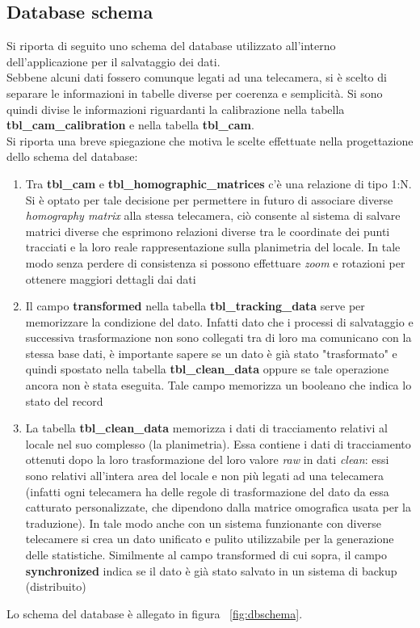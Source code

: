 \documentclass[a4paper,13pt,twoside]{article}
\begin{document}
\subsection{Database schema} \label{sec:dbschema}
Si riporta di seguito uno schema del database utilizzato all'interno dell'applicazione per il salvataggio dei dati. \\
Sebbene alcuni dati fossero comunque legati ad una telecamera, si è scelto di separare le informazioni in tabelle diverse per coerenza e semplicità. Si sono quindi divise le informazioni riguardanti la calibrazione nella tabella \textbf{tbl_cam_calibration} e nella tabella \textbf{tbl_cam}.\\
Si riporta una breve spiegazione che motiva le scelte effettuate nella progettazione dello schema del database:
\begin{enumerate}
	\item Tra \textbf{tbl_cam} e \textbf{tbl_homographic_matrices} c'è una relazione di tipo 1:N. Si è optato per tale decisione per permettere in futuro di associare diverse \textit{homography matrix} alla stessa telecamera, ciò consente al sistema di salvare matrici diverse che esprimono relazioni diverse tra le coordinate dei punti tracciati e la loro reale rappresentazione sulla planimetria del locale. In tale modo senza perdere di consistenza si possono effettuare \textit{zoom} e rotazioni per ottenere maggiori dettagli dai dati
	\item Il campo \textbf{transformed} nella tabella \textbf{tbl_tracking_data} serve per memorizzare la condizione del dato. Infatti dato che i processi di salvataggio e successiva trasformazione non sono collegati tra di loro ma comunicano con la stessa base dati, è importante sapere se un dato è già stato "trasformato" e quindi spostato nella tabella \textbf{tbl_clean_data} oppure se tale operazione ancora non è stata eseguita. Tale campo memorizza un booleano che indica lo stato del record
	\item La tabella \textbf{tbl_clean_data} memorizza i dati di tracciamento relativi al locale nel suo complesso (la planimetria). Essa contiene i dati di tracciamento ottenuti dopo la loro trasformazione del loro valore \textit{raw} in dati \textit{clean}: essi sono relativi all'intera area del locale e non più legati ad una telecamera (infatti ogni telecamera ha delle regole di trasformazione del dato da essa catturato personalizzate, che dipendono dalla matrice omografica usata per la traduzione). In tale modo anche con un sistema funzionante con diverse telecamere si crea un dato unificato e pulito utilizzabile per la generazione delle statistiche. Similmente al campo transformed di cui sopra, il campo \textbf{synchronized} indica se il dato è già stato salvato in un sistema di backup (distribuito)
\end{enumerate}
Lo schema del database è allegato in figura ~\ref{fig:dbschema}.
\end{document}
